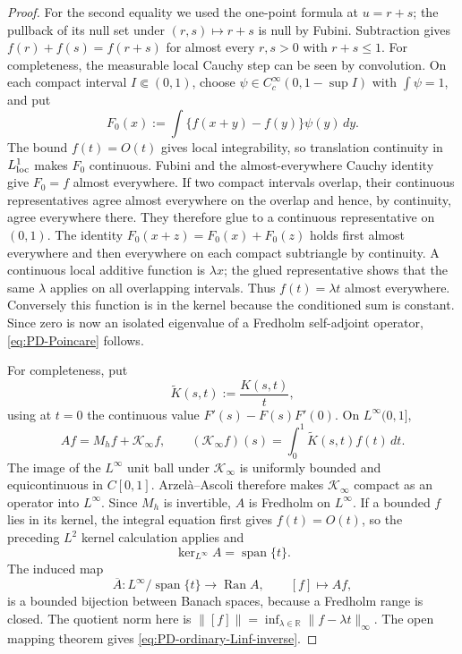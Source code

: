 \documentclass[11pt]{article}
\numberwithin{equation}{section}
\theoremstyle{definition}
\theoremstyle{remark}
\newcommand{\1}{\mathbf 1}
\begin{document}
\begin{proof}
For the second equality we used the one-point formula at \(u=r+s\);
the pullback of its null set under \((r,s)\mapsto r+s\) is null by
Fubini.  Subtraction gives
\(f(r)+f(s)=f(r+s)\) for almost every \(r,s>0\) with \(r+s\leq1\).
For completeness, the measurable local Cauchy step can be seen by
convolution.  On each compact interval \(I\Subset(0,1)\), choose
\(\psi\in C_c^\infty(0,1-\sup I)\) with \(\int\psi=1\), and put
\[
 F_0(x):=\int\{f(x+y)-f(y)\}\psi(y)\,dy.
\]
The bound \(f(t)=O(t)\) gives local integrability, so translation
continuity in \(L^1_{\rm loc}\) makes \(F_0\) continuous.  Fubini and the
almost-everywhere Cauchy identity give \(F_0=f\) almost everywhere.
If two compact intervals overlap, their continuous representatives agree
almost everywhere on the overlap and hence, by continuity, agree
everywhere there.  They therefore glue to a continuous representative on
\((0,1)\).  The identity \(F_0(x+z)=F_0(x)+F_0(z)\) holds first almost
everywhere and then everywhere on each compact subtriangle by continuity.
A continuous local additive function is \(\lambda x\); the glued
representative shows that the same \(\lambda\) applies on all overlapping
intervals.  Thus \(f(t)=\lambda t\) almost everywhere.
Conversely this function is in the kernel because the
conditioned sum is constant.  Since zero is now an isolated eigenvalue of
a Fredholm self-adjoint operator, \eqref{eq:PD-Poincare} follows.

For completeness, put
\[
 \widetilde K(s,t):=\frac{K(s,t)}t,
\]
using at \(t=0\) the continuous value
\(F'(s)-F(s)F'(0)\).  On \(L^\infty(0,1]\),
\[
 Af=M_hf+\mathcal K_\infty f,\qquad
 (\mathcal K_\infty f)(s)
   =\int_0^1\widetilde K(s,t)f(t)\,dt.
\]
The image of the \(L^\infty\) unit ball under \(\mathcal K_\infty\) is
uniformly bounded and equicontinuous in \(C[0,1]\).  Arzel\`a--Ascoli
therefore makes \(\mathcal K_\infty\) compact as an operator into
\(L^\infty\).  Since \(M_h\) is invertible, \(A\) is Fredholm on
\(L^\infty\).  If a bounded \(f\) lies in its kernel, the integral
equation first gives \(f(t)=O(t)\), so the preceding \(L^2\) kernel
calculation applies and
\[
                         \ker_{L^\infty}A
              =\operatorname{span}\{t\}.
\]
The induced map
\[
 \overline A:L^\infty/\operatorname{span}\{t\}
       \longrightarrow\operatorname{Ran}A,\qquad [f]\longmapsto Af,
\]
is a bounded bijection between Banach spaces, because a Fredholm range is
closed.  The quotient norm here is
\(\|[f]\|=\inf_{\lambda\in\mathbb R}\|f-\lambda t\|_\infty\).
The open mapping theorem gives
\eqref{eq:PD-ordinary-Linf-inverse}.


\end{proof}
\end{document}
